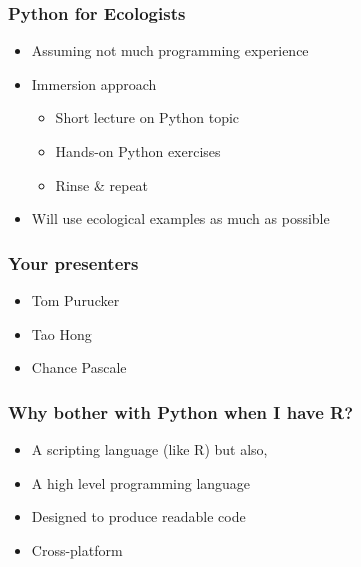 \documentclass{beamer}
\newcommand\Fontvi{\fontsize{6}{7.2}\selectfont}
\begin{document}



\begin{frame}[fragile]
\frametitle{Python for Ecologists}
\begin{itemize}
  \item Assuming not much programming experience
  \item Immersion approach 
\begin{itemize}
  \item Short lecture on Python topic
  \item Hands-on Python exercises 
  \item Rinse \& repeat
\end{itemize}
  \item Will use ecological examples as much as possible
\end{itemize} 
\end{frame}

\begin{frame}[fragile]
\frametitle{Your presenters}
\begin{itemize}
\item Tom Purucker  
\item Tao Hong 
\item Chance Pascale
\end{itemize} 
\end{frame}

\begin{frame}[fragile]
\frametitle{Why bother with Python when I have R?}
\begin{itemize}
\item A scripting language (like R) but also, 
\item A high level programming language
\item Designed to produce readable code 
\item Cross-platform 
\end{itemize} 
\end{frame}
\end{document}
